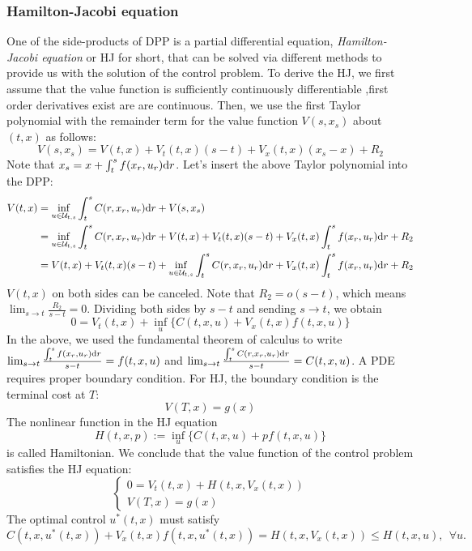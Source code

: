 \documentclass[11pt]{book}
\newcommand{\dr}{\text{\normalfont d}r}
\begin{document}
\subsubsection{Hamilton-Jacobi equation}
\label{sec:HJ}
One of the side-products of DPP is a partial differential equation, \emph{Hamilton-Jacobi equation} or HJ for short, that can be solved via different methods to provide us with the solution of the control problem. 
To derive the HJ, we first assume that the value function is sufficiently continuously differentiable ,first order derivatives exist are are continuous. Then, we use the first Taylor polynomial with the remainder term for the value function $V(s,x_s)$ about $(t,x)$ as follows:
\[
V(s,x_s) = V(t,x) + V_t(t,x)(s-t) + V_x(t,x)(x_s-x) + R_2
\]
Note that $x_s=x+\int_t^s f(x_r,u_r){{\dr}}$. Let's insert the above Taylor polynomial into the DPP:
\[
\begin{split}
    V(t,x) & =\inf_{u\in\mathcal{U}_{t,s}}\int_t^sC(r,x_r,u_r){{\dr}}+V(s,x_s)\\
    & = \inf_{u\in\mathcal{U}_{t,s}}\int_t^sC(r,x_r,u_r){{\dr}}+V(t,x) + V_t(t,x)(s-t) + V_x(t,x)\int_t^s f(x_r,u_r){{\dr}} + R_2\\
    &= V(t,x) + V_t(t,x)(s-t) +\inf_{u\in\mathcal{U}_{t,s}}\int_t^sC(r,x_r,u_r){{\dr}} + V_x(t,x)\int_t^s f(x_r,u_r){{\dr}} + R_2\\
\end{split}
\]
$V(t,x)$ on both sides can be canceled. Note that $R_2=o(s-t)$, which means $\lim_{s\to t} \frac{R_2}{s-t}=0$.
Dividing both sides by $s-t$ and sending $s\to t$, we obtain
\begin{equation}\label{eqn:HJ_deterministic}
        0 = V_t(t,x) +\inf_{u} \{C(t,x,u) + V_x(t,x)f(t,x,u)\}
\end{equation}
In the above, we used the fundamental theorem of calculus to write $\lim_{s\to t} \frac{\int_t^s f(x_r,u_r){{\dr}}}{s-t}=f(t,x,u)$ and $\lim_{s\to t} \frac{\int_t^sC(r,x_r,u_r){{\dr}}}{s-t}=C(t,x,u)$.
A PDE requires proper boundary condition. For HJ, the boundary condition is the terminal cost at $T$:
\begin{equation}
    \label{eqn:HJ_terminal}
    V(T,x)=g(x)
\end{equation}
The nonlinear function in the HJ equation
\begin{equation}
    H(t,x,p):=\inf_{u} \{C(t,x,u) + pf(t,x,u)\}
\end{equation}
is called Hamiltonian.
We conclude that the value function of the control problem satisfies the HJ equation: 
\begin{equation}
    \label{eqn:HJ_w_Hamiltonian}
    \begin{cases}
        0=V_t(t,x)+H(t,x,V_x(t,x))\\
        V(T,x)=g(x)
    \end{cases}
\end{equation}
The optimal control $u^*(t,x)$ must satisfy
\begin{equation}\label{cond:optimality_deterministic}
C(t,x,u^*(t,x)) + V_x(t,x)f(t,x,u^*(t,x)) = H(t,x,V_x(t,x))\le H(t,x,u),~~\forall u.
\end{equation}
\end{document}
